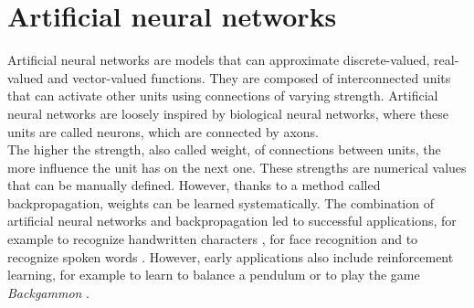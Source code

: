 \chapter{Artificial neural networks} %
\label{cha:artificial_neural_networks}
Artificial neural networks are models that can approximate discrete-valued, real-valued and vector-valued functions.
They are composed of interconnected units that can activate other units using connections of varying strength.
Artificial neural networks are loosely inspired by biological neural networks, where these units are called neurons, which are connected by axons.\\
The higher the strength, also called weight, of connections between units, the more influence the unit has on the next one. These strengths are numerical values that can be manually defined. However, thanks to a method called backpropagation, weights can be learned systematically.
The combination of artificial neural networks and backpropagation led to successful applications, for example to recognize handwritten characters \parencite{journals/neco/LeCunBDHHHJ89}, for face recognition \parencite{cottrell1990extracting} and to recognize spoken words \parencite{journals/nn/LangWH90}.
However, early applications also include reinforcement learning, for example to learn to balance a pendulum \parencite{anderson:ieeecsm89} or to play the game \textit{Backgammon} \parencite{Tesauro:92}.

